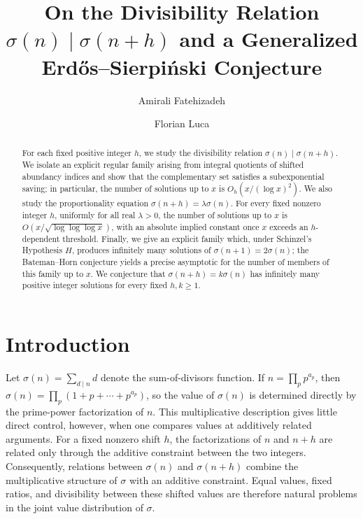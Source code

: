 \documentclass[11pt,reqno]{amsart}
\title[DIVISIBILITY OF SHIFTED SUM-OF-DIVISORS VALUES]{On the Divisibility Relation $\sigma(n)\mid\sigma(n+h)$ and a Generalized Erd\H{o}s--Sierpi\'nski Conjecture}
\author{Amirali Fatehizadeh}
\author{Florian Luca}
\date{}
\numberwithin{equation}{section}
\theoremstyle{plain}
\theoremstyle{definition}
\theoremstyle{remark}
\begin{document}
\begin{abstract}
For each fixed positive integer $h$, we study the divisibility relation $\sigma(n)\mid\sigma(n+h)$. We isolate an explicit regular family arising from integral quotients of shifted abundancy indices and show that the complementary set satisfies a subexponential saving; in particular, the number of solutions up to $x$ is $O_h(x/(\log x)^2)$. We also study the proportionality equation $\sigma(n+h)=\lambda\sigma(n)$. For every fixed nonzero integer $h$, uniformly for all real $\lambda>0$, the number of solutions up to $x$ is $O(x/\sqrt{\log\log\log x})$, with an absolute implied constant once $x$ exceeds an $h$-dependent threshold. Finally, we give an explicit family which, under Schinzel's Hypothesis $H$, produces infinitely many solutions of $\sigma(n+1)=2\sigma(n)$; the Bateman--Horn conjecture yields a precise asymptotic for the number of members of this family up to $x$. We conjecture that $\sigma(n+h)=k\sigma(n)$ has infinitely many positive integer solutions for every fixed $h,k\ge1$.
\end{abstract}

\maketitle
\enlargethispage{2pt}

\section{Introduction}\label{sec:introduction}

Let $\sigma(n)=\sum_{d\mid n}d$ denote the sum-of-divisors function.
If $n=\prod_p p^{a_p}$, then
$\sigma(n)=\prod_p(1+p+\cdots+p^{a_p})$, so the value of $\sigma(n)$
is determined directly by the prime-power factorization of $n$.
This multiplicative description gives little direct control, however,
when one compares values at additively related arguments. For a fixed
nonzero shift $h$, the factorizations of $n$ and $n+h$ are related only
through the additive constraint between the two integers. Consequently,
relations between $\sigma(n)$ and $\sigma(n+h)$ combine the multiplicative
structure of $\sigma$ with an additive constraint. Equal values, fixed
ratios, and divisibility between these shifted values are therefore natural
problems in the joint value distribution of $\sigma$.
\end{document}
